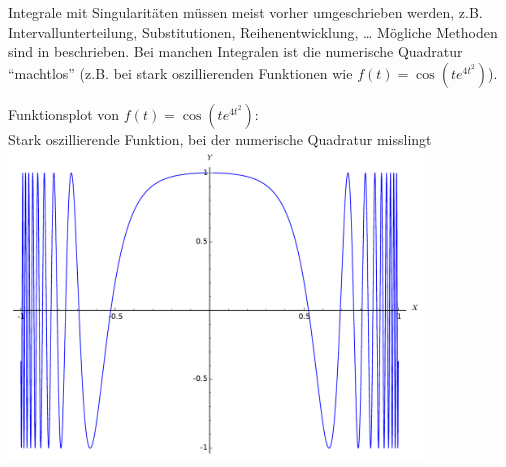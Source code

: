 Integrale mit Singularitäten müssen meist vorher 
umgeschrieben werden, z.B. Intervallunterteilung,
Substitutionen, Reihenentwicklung, …
Mögliche Methoden sind in \cite{stoer} beschrieben.
Bei manchen Integralen ist die numerische Quadratur \enquote{machtlos} 
(z.B. bei stark oszillierenden Funktionen wie
$f(t) = \cos(te^{4t^2})$).
\begin{image}{Funktionsplot von $f(t) = \cos(te^{4t^2})$:\\
    Stark oszillierende Funktion, bei der numerische
    Quadratur misslingt}
  \includegraphics[width=11cm]{images/stark_oszi_funktion2.pdf}
\end{image}


